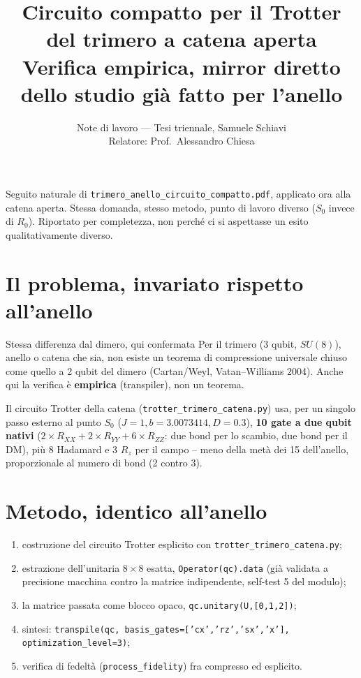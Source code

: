 \documentclass[11pt,a4paper]{article}
\title{\vspace{-1.5em}\color{inkblue}Circuito compatto per il Trotter del trimero a catena aperta\\[0.1em]
\Large\normalfont\color{softgray}Verifica empirica, mirror diretto dello studio già fatto per l'anello}
\author{Note di lavoro --- Tesi triennale, Samuele Schiavi\\ Relatore: Prof.\ Alessandro Chiesa}
\date{}
\begin{document}
\sloppy
\maketitle
\thispagestyle{fancy}
\vspace{-2em}

Seguito naturale di \texttt{trimero\_anello\_circuito\_compatto.pdf}, applicato
ora alla catena aperta. Stessa domanda, stesso metodo, punto di lavoro
diverso ($S_0$ invece di $R_0$). Riportato per completezza, non perché ci
si aspettasse un esito qualitativamente diverso.

\section{Il problema, invariato rispetto all'anello}

\begin{warnbox}{Stessa differenza dal dimero, qui confermata}
Per il trimero (3 qubit, $SU(8)$), anello o catena che sia, non esiste un
teorema di compressione universale chiuso come quello a 2 qubit del
dimero (Cartan/Weyl, Vatan--Williams 2004). Anche qui la verifica è
\textbf{empirica} (transpiler), non un teorema.
\end{warnbox}

Il circuito Trotter della catena (\texttt{trotter\_trimero\_catena.py}) usa,
per un singolo passo esterno al punto $S_0$ ($J{=}1,b{=}3.0073414,D{=}0.3$),
\textbf{10 gate a due qubit nativi} ($2\times R_{XX}+2\times R_{YY}+6\times
R_{ZZ}$: due bond per lo scambio, due bond per il DM), più 8 Hadamard e 3
$R_z$ per il campo -- meno della metà dei 15 dell'anello, proporzionale al
numero di bond (2 contro 3).

\section{Metodo, identico all'anello}

\begin{enumerate}[leftmargin=1.4em,itemsep=0.25em]
\item costruzione del circuito Trotter esplicito con
\texttt{trotter\_trimero\_catena.py};
\item estrazione dell'unitaria $8\times8$ esatta, \texttt{Operator(qc).data}
(già validata a precisione macchina contro la matrice indipendente, self-test
5 del modulo);
\item la matrice passata come blocco opaco, \texttt{qc.unitary(U,[0,1,2])};
\item sintesi: \texttt{transpile(qc, basis\_gates=['cx','rz','sx','x'],
optimization\_level=3)};
\item verifica di fedeltà (\texttt{process\_fidelity}) fra compresso ed
esplicito.
\end{enumerate}
\end{document}
